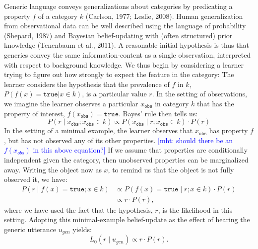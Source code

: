 \documentclass[floatsintext,doc]{apa6}
\newcommand{\mht}[1]{{\textcolor{Blue}{[mht: #1]}}}
\begin{document}
Generic language conveys generalizations about categories by predicating a property $f$ of a category $k$ (Carlson, 1977; Leslie, 2008).
Human generalization from observational data can be well described using the language of probability (Shepard, 1987) and Bayesian belief-updating with (often structured) prior knowledge (Tenenbaum et al., 2011).
A reasonable initial hypothesis is thus that generics convey the same information-content as a single observation, interpreted with respect to background knowledge.
We thus begin by considering a learner trying to figure out how strongly to expect the feature in the category: The learner considers the hypothesis that the prevalence of $f$ in $k$, $P(f(x){=}\texttt{true} | x\in k)$, is a particular value $r$. In the setting of observations, we imagine the learner observes a particular $x_\texttt{obs}$ in category $k$ that has the property of interest, $f(x_\texttt{obs})=\texttt{true}$. Bayes' rule then tells us:
$$
P(r \mid x_\texttt{obs}; x_\texttt{obs} \in k) \propto P( x_\texttt{obs} \mid r; x_\texttt{obs}\in k) \cdot P(r)
$$
In the setting of a minimal example, the learner observes that $x_\texttt{obs}$ has property $f$, but has not observed any of its other properties.
\mht{should there be an $f(x_{obs})$ in this above equation?}
If we assume that properties are conditionally independent given the category, then unobserved properties can be marginalized away.
Writing the object now as $x$, to remind us that the object is not fully observed it, we have:
\begin{align}
P(r \mid  f(x){=}\texttt{true}; x \in k) &\propto P(f(x){=}\texttt{true} \mid r;   x \in k) \cdot P(r) \nonumber \\
&\propto r\cdot P(r), \nonumber
\end{align}
where we have used the fact that the hypothesis, $r$, is the likelihood in this setting.
Adopting this minimal-example belief-update as the effect of hearing the generic utterance $u_{gen}$ yields:
\begin{equation}
L_0(r \mid u_{gen}) \propto  r \cdot P(r). 
\label{eq:L0}
\end{equation}
\end{document}
